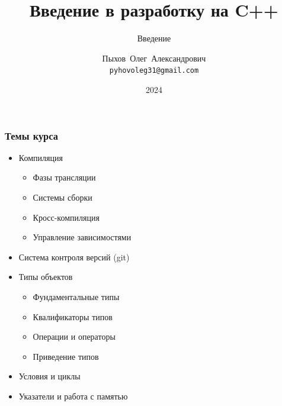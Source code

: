 \documentclass{beamer}
\title{Введение в разработку на C++}
\subtitle{Введение}
\author{Пыхов~Олег~Александрович\inst{1} \\ \texttt{pyhovoleg31@gmail.com}}
\institute{
    \inst{1}%
    ООО~"Прософт-Системы"
}
\date{2024}
\begin{document}
\frame[plain]{\titlepage}

\begin{frame}

    \frametitle{Темы курса}

    \begin{itemize}

        \item Компиляция

            \begin{itemize}

                \item Фазы трансляции

                \item Системы сборки

                \item Кросс-компиляция

                \item Управление зависимостями

            \end{itemize}

        \item Система контроля версий (git)

        \item Типы объектов

            \begin{itemize}

                \item Фундаментальные типы

                \item Квалификаторы типов

                \item Операции и операторы

                \item Приведение типов

            \end{itemize}

        \item Условия и циклы

        \item Указатели и работа с памятью

    \end{itemize}

\end{frame}
\end{document}

